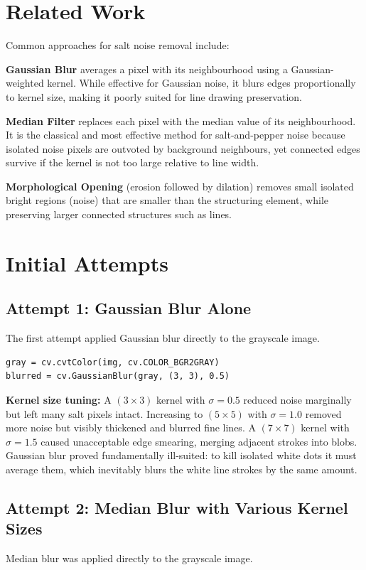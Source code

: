 \documentclass[journal]{IEEEtran}
\begin{document}
\section{Related Work}
Common approaches for salt noise removal include:

\textbf{Gaussian Blur} averages a pixel with its neighbourhood 
using a Gaussian-weighted kernel. While effective for Gaussian noise, it blurs edges 
proportionally to kernel size, making it poorly suited for line drawing preservation.

\textbf{Median Filter} replaces each pixel with the median value 
of its neighbourhood. It is the classical and most effective method for salt-and-pepper 
noise because isolated noise pixels are outvoted by background neighbours, yet connected 
edges survive if the kernel is not too large relative to line width.

\textbf{Morphological Opening} (erosion followed by dilation) 
removes small isolated bright regions (noise) that are smaller than the structuring 
element, while preserving larger connected structures such as lines.

\section{Initial Attempts}

\subsection{Attempt 1: Gaussian Blur Alone}
The first attempt applied Gaussian blur directly to the grayscale image.

\begin{lstlisting}
gray = cv.cvtColor(img, cv.COLOR_BGR2GRAY)
blurred = cv.GaussianBlur(gray, (3, 3), 0.5)
\end{lstlisting}

\textbf{Kernel size tuning:} A $(3\times3)$ kernel with $\sigma=0.5$ reduced noise 
marginally but left many salt pixels intact. Increasing to $(5\times5)$ with $\sigma=1.0$ 
removed more noise but visibly thickened and blurred fine lines. A $(7\times7)$ kernel 
with $\sigma=1.5$ caused unacceptable edge smearing, merging adjacent strokes into blobs. 
Gaussian blur proved fundamentally ill-suited: to kill isolated white dots it must 
average them, which inevitably blurs the white line strokes by the same amount.

\subsection{Attempt 2: Median Blur with Various Kernel Sizes}
Median blur was applied directly to the grayscale image.
\end{document}
